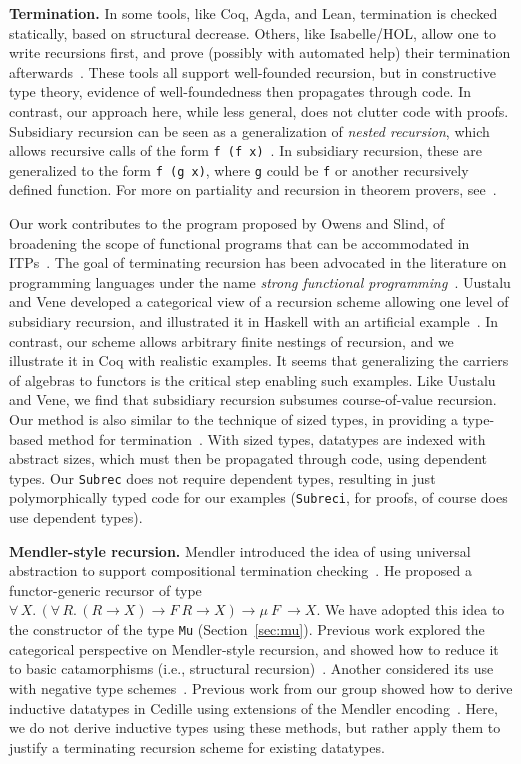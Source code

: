 \documentclass[a4paper,USenglish]{lipics-v2021}
\newcommand{\all}[2]{\forall\, #1.\, #2}
\begin{document}
\textbf{Termination.}  In some tools, like Coq, Agda, and Lean,
termination is checked statically, based on structural decrease.
Others, like Isabelle/HOL, allow one to write recursions first, and
prove (possibly with automated help) their termination
afterwards~\cite{krauss}.  These tools all support well-founded
recursion, but in constructive type theory, evidence of
well-foundedness then propagates through code.  In contrast, our
approach here, while less general, does not clutter code with proofs.
Subsidiary recursion can be seen as a generalization of \emph{nested
recursion}, which allows recursive calls of the form
\verb|f (f x)|~\cite{krauss10}.  In subsidiary recursion, these are
generalized to the form \verb|f (g x)|, where \verb|g| could be
\verb|f| or another recursively defined function.  For more on
partiality and recursion in theorem provers, see~\cite{bove+16}.

Our work contributes to the program proposed by Owens and Slind, of
broadening the scope of functional programs that can be accommodated
in ITPs~\cite{owens+08}.  The goal of terminating recursion has been
advocated in the literature on programming languages under the name
\emph{strong functional programming}~\cite{turner95}.  Uustalu and
Vene developed a categorical view of a recursion scheme allowing one
level of subsidiary recursion, and illustrated it in Haskell with an
artificial example~\cite{uustalu11}.  In contrast, our scheme allows
arbitrary finite nestings of recursion, and we illustrate it in Coq
with realistic examples.  It seems that generalizing the carriers of
algebras to functors is the critical step enabling such examples.
Like Uustalu and Vene, we find that subsidiary recursion subsumes
course-of-value recursion.  Our method is also similar to the
technique of sized types, in providing a type-based method for
termination~\cite{barthe04}.  With sized types, datatypes are indexed
with abstract sizes, which must then be propagated through code, using
dependent types.  Our \verb|Subrec| does not require dependent types,
resulting in just polymorphically typed code for our examples
(\verb|Subreci|, for proofs, of course does use dependent types).

\textbf{Mendler-style recursion.}  Mendler introduced the idea of
using universal abstraction to support compositional termination
checking~\cite{mendler91}.  He proposed a functor-generic recursor of
type $\all{X}{(\all{R}{(R \to X) \to F\ R \to X}) \to \mu\ F\ \to
  X}$. We have adopted this idea to the constructor of the type
\verb|Mu| (Section~\ref{sec:mu}).  Previous work explored the
categorical perspective on Mendler-style recursion, and showed how to
reduce it to basic catamorphisms (i.e., structural
recursion)~\cite{uustalu99}.  Another considered its use with negative
type schemes~\cite{ahn11}.  Previous work from our group showed how to
derive inductive datatypes in Cedille using extensions of the Mendler
encoding~\cite{firsov+18b,firsov+18a}.  Here, we do not derive
inductive types using these methods, but rather apply them to justify
a terminating recursion scheme for existing datatypes.
\end{document}
